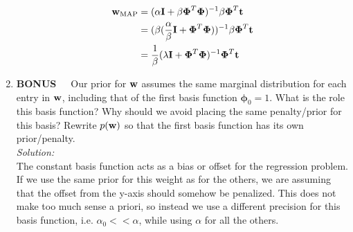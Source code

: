 \documentclass[12pt,a4paper]{article}
\newcommand{\eye}{{\bf I}}
\newcommand{\tscalar}{t}
\newcommand{\tvec}{{\bf \tscalar}}
\newcommand{\wscalar}{w}
\newcommand{\wvec}{{\bf \wscalar}}
\newcommand{\wvecMAP}{\wvec_{\text{MAP}}}
\newcommand{\phivec}{\boldsymbol{\phi}}
\newcommand{\Phimat}{\boldsymbol{\Phi}}
\begin{document}
\begin{enumerate}
		  \begin{align*}
		  	\wvecMAP &= (\alpha \eye + \beta \Phimat^T \Phimat)^{-1} \beta \Phimat^T \tvec \\
		  	&=(\beta (\frac{\alpha}{\beta} \eye + \Phimat^T\Phimat))^{-1} \beta \Phimat^T \tvec \\
		  	&= \frac{1}{\beta}(\lambda \eye + \Phimat^T\Phimat)^{-1}\Phimat^T \tvec
		  \end{align*}
  
  \item {\bf BONUS}~~~Our prior for $\wvec$ assumes the same marginal distribution for each entry in $\wvec$, including that of the first basis function $\phivec_0 = 1$.  What is the role this basis function?  Why should we avoid placing the same penalty/prior for this basis?  Rewrite $p(\wvec)$ so that the first basis function has its own prior/penalty. \\
	  \emph{Solution:} \\
		  The constant basis function acts as a bias or offset for the regression problem. If we use the same prior for this weight as for the others, we are assuming that the offset from the y-axis should somehow be penalized. This does not make too much sense a priori, so instead we use a different precision for this basis function, i.e. $\alpha_0 << \alpha$, while using $\alpha$ for all the others.
  
\end{enumerate}

\vspace{0.25in}
\end{document}

